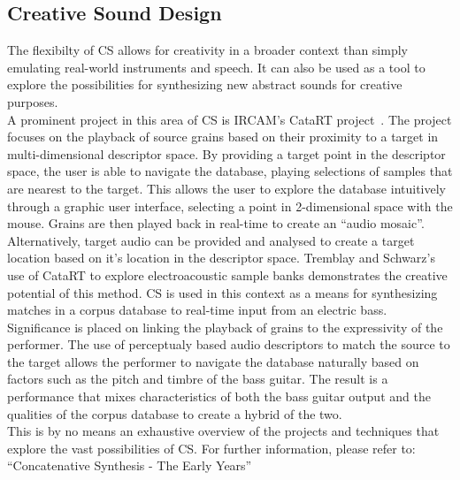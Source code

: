 \documentclass{scrartcl}
\begin{document}
    \subsection*{Creative Sound Design}
    The flexibilty of CS allows for creativity in a broader context than simply
    emulating real-world instruments and speech. It can also be used as a tool
    to explore the possibilities for synthesizing new abstract sounds for
    creative purposes.\\
    A prominent project in this area of CS is IRCAM's CataRT
    project~\parencite{Schwarz2006a}. The project focuses on the playback of
    source grains based on their proximity to a target in multi-dimensional
    descriptor space.  By providing a target point in the descriptor space, the
    user is able to navigate the database, playing selections of samples that
    are nearest to the target. This allows the user to explore the database
    intuitively through a graphic user interface, selecting a point in
    2-dimensional space with the mouse. Grains are then played back in
    real-time to create an ``audio mosaic''.\\
    Alternatively, target audio can be provided and analysed to create a target
    location based on it's location in the descriptor space.  Tremblay and
    Schwarz's~\citeyearpar{Tremblay2010} use of CataRT to explore
    electroacoustic sample banks demonstrates the creative potential of this
    method. CS is used in this context as a means for synthesizing matches in a
    corpus database to real-time input from an electric bass.  Significance is
    placed on linking the playback of grains to the expressivity of the
    performer. The use of perceptualy based audio descriptors to match the
    source to the target allows the performer to navigate the database
    naturally based on factors such as the pitch and timbre of the bass
    guitar. The result is a performance that mixes characteristics of both the
    bass guitar output and the qualities of the corpus database to create a
    hybrid of the two.\\

    This is by no means an exhaustive overview of the projects and techniques
    that explore the vast possibilities of CS. For further information, please
    refer to: ``Concatenative Synthesis - The Early
    Years''~\parencite{Schwarz2006b}
\end{document}
